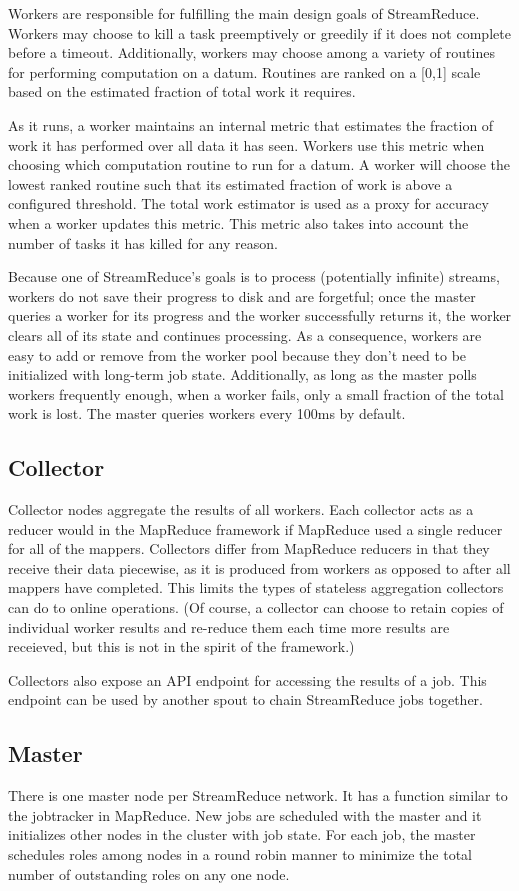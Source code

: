 \documentclass[12pt,twocolumn]{article}
\begin{document}
Workers are responsible for fulfilling the main design goals of StreamReduce. Workers may choose
to kill a task preemptively or greedily if it does not complete before a timeout. Additionally,
workers may choose among a variety of routines for performing computation on a datum.
Routines are ranked on a [0,1] scale based on the estimated fraction of total work it
requires.

As it runs, a worker maintains an internal metric that estimates the fraction of work
it has performed over all data it has seen. Workers use this metric when choosing which
computation routine to run for a datum. A worker will choose the lowest ranked routine
such that its estimated fraction of work is above a configured threshold.
The total work estimator is used as a proxy for accuracy when a worker updates
this metric. This metric also takes into account the number of tasks it has killed
for any reason.

Because one of StreamReduce's goals is to process (potentially infinite) streams, workers do not
save their progress to disk and are forgetful; once the master queries a worker for its
progress and the worker successfully returns it, the worker clears all of its state and
continues processing. As a consequence, workers are easy to add or remove from the worker
pool because they don't need to be initialized with long-term job state. Additionally, as
long as the master polls workers frequently enough, when a worker fails, only a small
fraction of the total work is lost. The master queries workers every 100ms by default.
\subsection{Collector}
Collector nodes aggregate the results of all workers. Each collector acts as a reducer would
in the MapReduce framework if MapReduce used a single reducer for all of the mappers.
Collectors differ from MapReduce reducers in that they receive their data piecewise, as it
is produced from workers as opposed to after all mappers have completed. This limits the
types of stateless aggregation collectors can do to online operations. (Of course, a collector
can choose to retain copies of individual worker results and re-reduce them each time more
results are receieved, but this is not in the spirit of the framework.)

Collectors also expose an API endpoint for accessing the results of a job. This endpoint
can be used by another spout to chain StreamReduce jobs together.
\subsection{Master}
\label{sec:master}
There is one master node per StreamReduce network. It has a function similar to the jobtracker in
MapReduce. New jobs are scheduled with the master and it initializes other nodes in the
cluster with job state. For each job, the master schedules roles among nodes in a round robin
manner to minimize the total number of outstanding roles on any one node.
\end{document}
